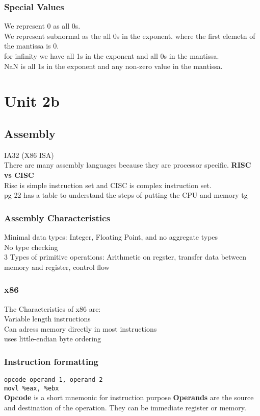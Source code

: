 \documentclass[answers,12pt,addpoints]{exam}
\begin{document}
\subsubsection{Special Values}
We represent 0 as all 0s. \\
We represent subnormal as the all 0s in the exponent. where the first elemetn of the mantissa is 0. \\
for infinity we have all 1s in the exponent and all 0s in the mantissa. \\
NaN is all 1s in the exponent and any non-zero value in the mantissa. \\

\newpage
\section{Unit 2b}
\subsection{Assembly}
IA32 (X86 ISA)\\
There are many assembly languages because they are processor specific. 
\textbf{RISC vs CISC} \\
Risc is simple instruction set and CISC is complex instruction set. \\
pg 22 has a table to understand the steps of putting the CPU and memory tg\\
\subsubsection{Assembly Characteristics}
Minimal data types: Integer, Floating Point, and no aggregate types \\
No type checking \\
3 Types of primitive operations: Arithmetic on regster, transfer data between memory and register, control flow 
\subsubsection{x86} 
The Characteristics of x86 are: \\
Variable length instructions \\
Can adress memory directly in most instructions\\
uses little-endian byte ordering \\
\subsubsection{Instruction formatting}
\texttt{opcode operand 1, operand 2} \\
\texttt{movl \%eax, \%ebx} \\
\textbf{Opcode} is a short mnemonic for instruction purpose
\textbf{Operands} are the source and destination of the operation. They can be immediate register or memory. \\
\end{document}
